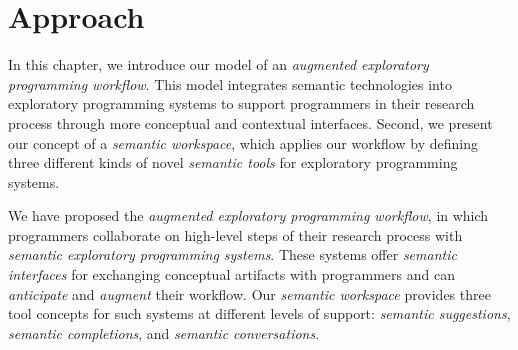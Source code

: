 
\chapter{Approach}
\label{cha:approach}

In this chapter, we introduce our model of an \emph{augmented exploratory programming workflow}.
This model integrates semantic technologies into exploratory programming systems to support programmers in their research process through more conceptual and contextual interfaces.
Second, we present our concept of a \emph{semantic workspace}, which applies our workflow by defining three different kinds of novel \emph{semantic tools} for exploratory programming systems.


\begin{summary}
	We have proposed the \emph{augmented exploratory programming workflow}, in which programmers collaborate on high-level steps of their research process with \emph{semantic exploratory programming systems}.
	These systems offer \emph{semantic interfaces} for exchanging conceptual artifacts with programmers and can \emph{anticipate} and \emph{augment} their workflow.
	Our \emph{semantic workspace} provides three tool concepts for such systems at different levels of support: \emph{semantic suggestions}, \emph{semantic completions}, and \emph{semantic conversations}.
\end{summary}
